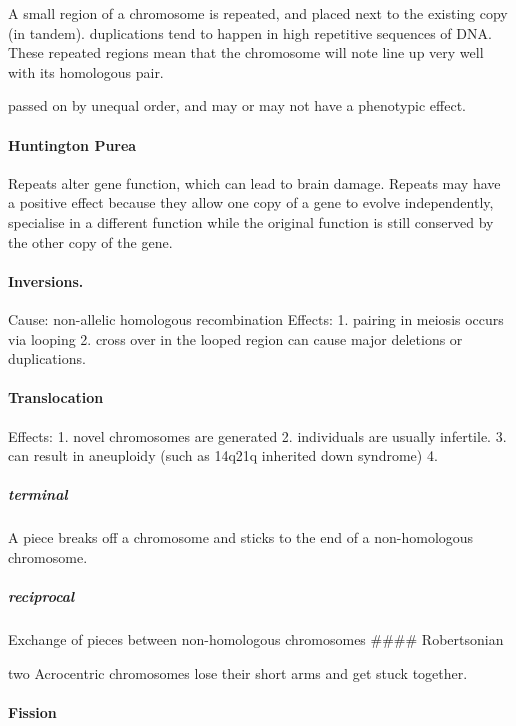 \documentclass[]{article}
\let\oldparagraph\paragraph
\renewcommand{\paragraph}[1]{\oldparagraph{#1}\mbox{}}
\let\oldsubparagraph\subparagraph
\renewcommand{\subparagraph}[1]{\oldsubparagraph{#1}\mbox{}}
\begin{document}
A small region of a chromosome is repeated, and placed next to the
existing copy (in tandem). duplications tend to happen in high
repetitive sequences of DNA. These repeated regions mean that the
chromosome will note line up very well with its homologous pair.

passed on by unequal order, and may or may not have a phenotypic effect.

\hypertarget{huntington-purea-1}{%
\paragraph{Huntington Purea}\label{huntington-purea-1}}

Repeats alter gene function, which can lead to brain damage. Repeats may
have a positive effect because they allow one copy of a gene to evolve
independently, specialise in a different function while the original
function is still conserved by the other copy of the gene.

\hypertarget{inversions.-1}{%
\paragraph{Inversions.}\label{inversions.-1}}

Cause: non-allelic homologous recombination Effects: 1. pairing in
meiosis occurs via looping 2. cross over in the looped region can cause
major deletions or duplications.

\hypertarget{translocation-1}{%
\paragraph{Translocation}\label{translocation-1}}

Effects: 1. novel chromosomes are generated 2. individuals are usually
infertile. 3. can result in aneuploidy (such as 14q21q inherited down
syndrome) 4.

\hypertarget{terminal-1}{%
\subparagraph{terminal}\label{terminal-1}}

A piece breaks off a chromosome and sticks to the end of a
non-homologous chromosome.

\hypertarget{reciprocal-1}{%
\subparagraph{reciprocal}\label{reciprocal-1}}

Exchange of pieces between non-homologous chromosomes \#\#\#\#
Robertsonian

two Acrocentric chromosomes lose their short arms and get stuck
together.

\hypertarget{fission-1}{%
\paragraph{Fission}\label{fission-1}}
\end{document}

